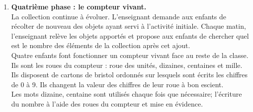\begin{exercice*}
\begin{enumerate}
   \item {\bf Quatrième phase : le compteur vivant.} \\
   La collection continue à évoluer. L'enseignant demande aux enfants de récolter de nouveau des objets ayant servi à l'activité initiale. Chaque matin, l'enseignant relève les objets apportés et propose aux enfants de chercher quel est le nombre des éléments de la collection après cet ajout. \\
   Quatre enfants font fonctionner un \og compteur vivant\fg{} face au reste de la classe. Ils \og sont\fg{} les roues du compteur : roue des unités, dizaines, centaines et mille. Ils disposent de cartons de bristol ordonnés sur lesquels sont écrits les chiffres de 0 à 9. Ils changent la valeur des chiffres de leur roue à bon escient. \\
   Les mots \og dizaine\fg{}, \og centaine\fg{} sont utilisés chaque fois que nécessaire; l'écriture du nombre à l'aide des \og roues\fg{} du compteur et mise en évidence.  
   \end{enumerate}
\end{exercice*}

\bigskip


